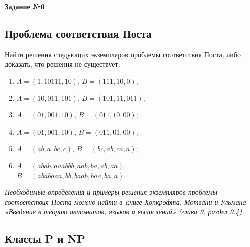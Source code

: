 \documentclass[12pt,a4paper]{article}
\begin{document}
\begin{center} 
\bfseries\LARGE Задание №6
\end{center}

\subsection*{Проблема соответствия Поста}


Найти решения следующих экземпляров проблемы соответствия Поста, 
либо доказать, что решения не существует:

\begin{multicols}{2}
  \begin{enumerate}[label=\arabic*),itemsep=5pt]
  \item $A=(1,10111,10)$, $B=(111,10,0)$;
  \item $A=(10,011,101)$, $B=(101,11,011)$;
  \item $A=(01,001,10)$, $B=(011,10,00)$;
  \item $A=(01,001,10)$, $B=(011,01,00)$;
  \item $A=(ab,a,bc,c)$, $B=(bc,ab,ca,a)$;
  \item $A=(abab,aaabbb,aab,ba,ab,aa)$,\\$B=(ababaaa,bb,baab,baa,ba,a)$.
  \end{enumerate}
\end{multicols}

\emph{Необходимые определения и примеры решения экземпляров проблемы соответствия Поста можно найти в~книге Хопкрофта, Мотвани и Ульмана «Введение в теорию автоматов, языков и вычислений» (глава 9, раздел 9.4).}

\subsection*{Классы  P и NP}
\end{document}
